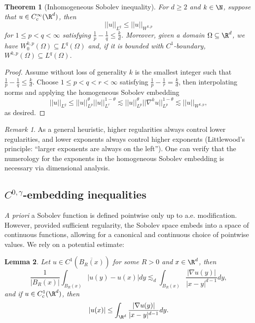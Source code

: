 \documentclass[reqno]{amsart}
\newtheorem{theorem}{Theorem}
\newtheorem{lemma}[theorem]{Lemma}
\theoremstyle{definition}
\theoremstyle{remark}
\newtheorem*{remark}{Remark}
\begin{document}
\begin{theorem}[Inhomogeneous Sobolev inequality]
	For $d \geq 2$ and $k \in \N$, suppose that $u \in C^\infty_c (\R^d)$, then 
		\[ ||u||_{L^q} \leq || u||_{W^{k, p}} \]
	for $1 \leq p < q < \infty$ satisfying $\tfrac{1}{p} - \tfrac{1}{q} \leq \tfrac{k}{d}$. Moreover, given a domain $\Omega \subseteq \R^d$, we have $W^{k, p}_0 (\Omega) \subseteq L^q (\Omega)$ and, if it is bounded with $C^1$-boundary, $W^{k, p} (\Omega) \subseteq L^q (\Omega)$. 
\end{theorem}

\begin{proof}
	Assume without loss of generality $k$ is the smallest integer such that $\tfrac{1}{p} - \tfrac{1}{q} \leq \tfrac{k}{d}$. Choose $1 \leq p < q < r < \infty$ satisfying $\tfrac{1}{p} - \tfrac{1}{r} = \tfrac{k}{d}$, then interpolating norms and applying the homogeneous Sobolev embedding
		\[ ||u||_{L^q} \leq ||u||^\theta_{L^p} ||u||^{1 - \theta}_{L^r} \lesssim ||u||^\theta_{L^p} ||\nabla^k u||_{L^p}^{1 - \theta} \lesssim ||u||_{W^{k, p}}, \]
	as desired. 	
\end{proof}

\begin{remark}
	As a general heuristic, higher regularities always control lower regularities, and lower exponents always control higher exponents (Littlewood's principle: ``larger exponents are always on the left''). One can verify that the numerology for the exponents in the homogeneous Sobolev embedding is necessary via dimensional analysis. 
\end{remark}

\subsection{$C^{0, \gamma}$-embedding inequalities}

\textit{A priori} a Sobolev function is defined pointwise only up to a.e. modification. However, provided sufficient regularity, the Sobolev space embeds into a space of continuous functions, allowing for a canonical and continuous choice of pointwise values. We rely on a potential estimate:

\begin{lemma}
	Let $u \in C^1 (\overline{B_R (x)})$ for some $R> 0$ and $x \in \R^d$, then 
		\[ \frac{1}{|B_R (x)|} \int_{B_R (x)} |u(y) - u(x)| dy \lesssim_d \int_{B_R (x)} \frac{|\nabla u (y)|}{|x - y|^{d - 1}} dy, \]
	and if $u \in C^1_c (\R^d)$, then 
		\[ |u(x)| \leq \int_{\R^d} \frac{|\nabla u (y)|}{|x - y|^{d - 1}} dy. \]	
\end{lemma}
\end{document}

